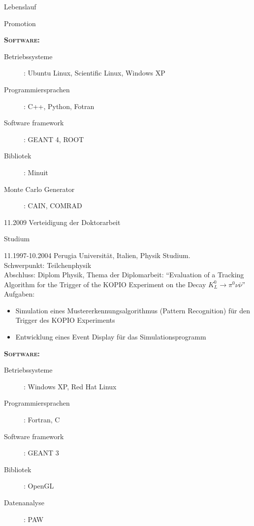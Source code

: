 \documentclass[11pt,a4paper]{scrartcl}
\begin{document}
\begin{cv}{Lebenslauf}
\begin{cvlist}{Promotion}
\begin{itemize}
\end{itemize}

{\scshape {\bfseries Software:}}
\begin{description}
\item[Betriebssysteme] : Ubuntu Linux, Scientific Linux, Windows XP
\item[Programmiersprachen] : C++, Python, Fotran
\item[Software framework] : GEANT 4, ROOT
\item[Bibliotek] : Minuit
\item[Monte Carlo Generator] : CAIN, COMRAD
\end{description}

\item[11.2009] Verteidigung der Doktorarbeit

\end{cvlist}

\begin{cvlist}{Studium}
\item [11.1997-10.2004]Perugia Universit\"at, Italien, Physik
Studium. \\ Schwerpunkt: Teilchenphysik\\ Abschluss: Diplom
Physik, Thema der Diplomarbeit: "`Evaluation of a Tracking
Algorithm for the Trigger of the KOPIO Experiment on the Decay
$K_L^0\rightarrow\pi^0\nu\bar{\nu}$"'\\

Aufgaben:\\

\begin{itemize}
  \item Simulation eines Mustererkennungsalgorithmus (Pattern
  Recognition) f{\"u}r den Trigger des KOPIO Experiments
  \item Entwicklung eines Event Display f{\"u}r das Simulationsprogramm
\end{itemize}

{\scshape {\bfseries Software:}}
\begin{description}
\item[Betriebssysteme] : Windows XP, Red Hat Linux
\item[Programmiersprachen] : Fortran, C
\item[Software framework] : GEANT 3
\item[Bibliotek] : OpenGL
\item[Datenanalyse] : PAW
\end{description}
\end{cvlist}


\end{cv}
\end{document}
